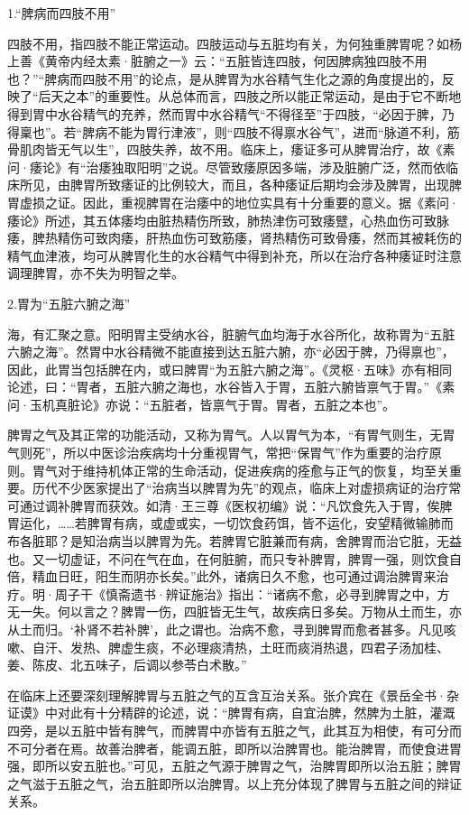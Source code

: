 \documentclass[12pt]{ctexbook}
\begin{document}

1.“脾病而四肢不用”

四肢不用，指四肢不能正常运动。四肢运动与五脏均有关，为何独重脾胃呢？如杨上善《黄帝内经太素·脏腑之一》云：“五脏皆连四肢，何因脾病独四肢不用也？”“脾病而四肢不用”的论点，是从脾胃为水谷精气生化之源的角度提出的，反映了“后天之本”的重要性。从总体而言，四肢之所以能正常运动，是由于它不断地得到胃中水谷精气的充养，然而胃中水谷精气“不得径至”于四肢，“必因于脾，乃得稟也”。若“脾病不能为胃行津液”，则“四肢不得禀水谷气”，进而“脉道不利，筋骨肌肉皆无气以生”，四肢失养，故不用。临床上，痿证多可从脾胃治疗，故《素问·痿论》有“治痿独取阳明”之说。尽管致痿原因多端，涉及脏腑广泛，然而依临床所见，由脾胃所致痿证的比例较大，而且，各种痿证后期均会涉及脾胃，出现脾胃虚损之证。因此，重视脾胃在治痿中的地位实具有十分重要的意义。据《素问·痿论》所述，其五体痿均由脏热精伤所致，肺热津伤可致痿躄，心热血伤可致脉痿，脾热精伤可致肉痿，肝热血伤可致筋痿，肾热精伤可致骨痿，然而其被耗伤的精气血津液，均可从脾胃化生的水谷精气中得到补充，所以在治疗各种痿证时注意调理脾胃，亦不失为明智之举。

2.胃为“五脏六腑之海”

海，有汇聚之意。阳明胃主受纳水谷，脏腑气血均海于水谷所化，故称胃为“五脏六腑之海”。然胃中水谷精微不能直接到达五脏六腑，亦“必因于脾，乃得禀也”，因此，此胃当包括脾在内，或曰脾胃“为五脏六腑之海”。《灵枢·五味》亦有相同论述，曰：“胃者，五脏六腑之海也，水谷皆入于胃，五脏六腑皆禀气于胃。”《素问·玉机真脏论》亦说：“五脏者，皆禀气于胃。胃者，五脏之本也”。

脾胃之气及其正常的功能活动，又称为胃气。人以胃气为本，“有胃气则生，无胃气则死”，所以中医诊治疾病均十分重视胃气，常把“保胃气”作为重要的治疗原则。胃气对于维持机体正常的生命活动，促进疾病的痊愈与正气的恢复，均至关重要。历代不少医家提出了“治病当以脾胃为先”的观点，临床上对虚损病证的治疗常可通过调补脾胃而获效。如清·王三尊《医权初编》说：“凡饮食先入于胃，俟脾胃运化，……若脾胃有病，或虚或实，一切饮食药饵，皆不运化，安望精微输肺而布各脏耶？是知治病当以脾胃为先。若脾胃它脏兼而有病，舍脾胃而治它脏，无益也。又一切虚证，不问在气在血，在何脏腑，而只专补脾胃，脾胃一强，则饮食自倍，精血日旺，阳生而阴亦长矣。”此外，诸病日久不愈，也可通过调治脾胃来治疗。明·周子干《慎斋遗书·辨证施治》指出：“诸病不愈，必寻到脾胃之中，方无一失。何以言之？脾胃一伤，四脏皆无生气，故疾病日多矣。万物从土而生，亦从土而归。‘补肾不若补脾’，此之谓也。治病不愈，寻到脾胃而愈者甚多。凡见咳嗽、自汗、发热、脾虚生痰，不必理痰清热，土旺而痰消热退，四君子汤加桂、姜、陈皮、北五味子，后调以参苓白术散。”

在临床上还要深刻理解脾胃与五脏之气的互含互治关系。张介宾在《景岳全书·杂证谟》中对此有十分精辟的论述，说：“脾胃有病，自宜治脾，然脾为土脏，灌溉四旁，是以五脏中皆有脾气，而脾胃中亦皆有五脏之气，此其互为相使，有可分而不可分者在焉。故善治脾者，能调五脏，即所以治脾胃也。能治脾胃，而使食进胃强，即所以安五脏也。”可见，五脏之气源于脾胃之气，治脾胃即所以治五脏；脾胃之气滋于五脏之气，治五脏即所以治脾胃。以上充分体现了脾胃与五脏之间的辩证关系。
\end{document}
